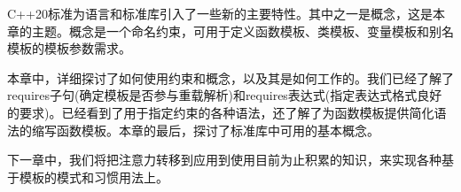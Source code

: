 C++20标准为语言和标准库引入了一些新的主要特性。其中之一是概念，这是本章的主题。概念是一个命名约束，可用于定义函数模板、类模板、变量模板和别名模板的模板参数需求。

本章中，详细探讨了如何使用约束和概念，以及其是如何工作的。我们已经了解了requires子句(确定模板是否参与重载解析)和requires表达式(指定表达式格式良好的要求)。已经看到了用于指定约束的各种语法，还了解了为函数模板提供简化语法的缩写函数模板。本章的最后，探讨了标准库中可用的基本概念。

下一章中，我们将把注意力转移到应用到使用目前为止积累的知识，来实现各种基于模板的模式和习惯用法上。